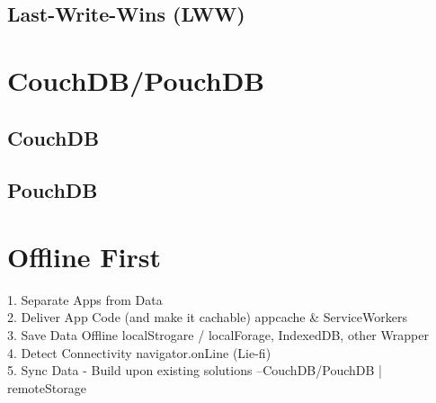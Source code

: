\subsection{Last-Write-Wins (LWW)}
%
%
\section{CouchDB/PouchDB}
\subsection{CouchDB}
\subsection{PouchDB}

%
%
\section{Offline First}
1. Separate Apps from Data\\
2. Deliver App Code (and make it cachable) {appcache \& ServiceWorkers}\\
3. Save Data Offline {localStrogare / localForage, IndexedDB, other Wrapper}\\
4. Detect Connectivity {navigator.onLine} (Lie-fi)\\
5. Sync Data - Build upon existing solutions --CouchDB/PouchDB | remoteStorage\\